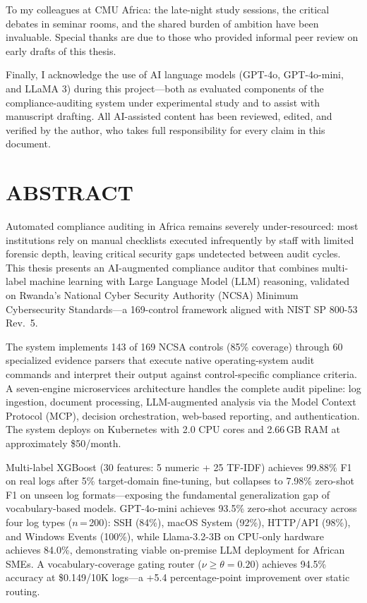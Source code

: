 \documentclass[12pt,oneside]{report}
\begin{document}
To my colleagues at CMU Africa: the late-night study sessions, the critical debates in seminar rooms, and the shared burden of ambition have been invaluable. Special thanks are due to those who provided informal peer review on early drafts of this thesis.

Finally, I acknowledge the use of AI language models (GPT-4o, GPT-4o-mini, and LLaMA 3) during this project—both as evaluated components of the compliance-auditing system under experimental study and to assist with manuscript drafting. All AI-assisted content has been reviewed, edited, and verified by the author, who takes full responsibility for every claim in this document.

\newpage
\chapter*{ABSTRACT}

Automated compliance auditing in Africa remains severely under-resourced: most institutions rely on manual checklists executed infrequently by staff with limited forensic depth, leaving critical security gaps undetected between audit cycles. This thesis presents an AI-augmented compliance auditor that combines multi-label machine learning with Large Language Model (LLM) reasoning, validated on Rwanda's National Cyber Security Authority (NCSA) Minimum Cybersecurity Standards—a 169-control framework aligned with NIST SP 800-53 Rev.\ 5.

The system implements 143 of 169 NCSA controls (85\% coverage) through 60 specialized evidence parsers that execute native operating-system audit commands and interpret their output against control-specific compliance criteria. A seven-engine microservices architecture handles the complete audit pipeline: log ingestion, document processing, LLM-augmented analysis via the Model Context Protocol (MCP), decision orchestration, web-based reporting, and authentication. The system deploys on Kubernetes with 2.0 CPU cores and 2.66\,GB RAM at approximately \$50/month.

Multi-label XGBoost (30 features: 5 numeric + 25 TF-IDF) achieves 99.88\% F1 on real logs after 5\% target-domain fine-tuning, but collapses to 7.98\% zero-shot F1 on unseen log formats—exposing the fundamental generalization gap of vocabulary-based models. GPT-4o-mini achieves 93.5\% zero-shot accuracy across four log types ($n$\,=\,200): SSH (84\%), macOS System (92\%), HTTP/API (98\%), and Windows Events (100\%), while Llama-3.2-3B on CPU-only hardware achieves 84.0\%, demonstrating viable on-premise LLM deployment for African SMEs. A vocabulary-coverage gating router ($\nu \geq \theta = 0.20$) achieves 94.5\% accuracy at \$0.149/10K logs—a +5.4 percentage-point improvement over static routing.
\end{document}
